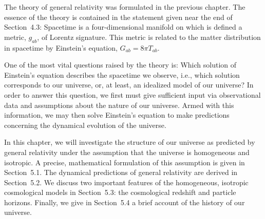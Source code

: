 
The theory of general relativity was formulated in the previous chapter. The essence
of the theory is contained in the statement given near the end of Section~4.3:
Spacetime is a four-dimensional manifold on which is defined a metric, \(g_{ab}\), of
Lorentz signature. This metric is related to the matter distribution in spacetime by
Einstein's equation, \(G_{ab}=8\pi T_{ab}\).

One of the most vital questions raised by the theory is: Which solution of
Einstein's equation describes the spacetime we observe, i.e., which solution
corresponds to our universe, or, at least, an idealized model of our universe? In
order to answer this question, we first must give sufficient input via observational
data and assumptions about the nature of our universe. Armed with this information,
we may then solve Einstein's equation to make predictions concerning the dynamical
evolution of the universe.

In this chapter, we will investigate the structure of our universe as predicted by
general relativity under the assumption that the universe is homogeneous and
isotropic. A precise, mathematical formulation of this assumption is given in
Section~5.1. The dynamical predictions of general relativity are derived in
Section~5.2. We discuss two important features of the homogeneous, isotropic
cosmological models in Section~5.3: the cosmological redshift and particle horizons.
Finally, we give in Section~5.4 a brief account of the history of our universe.
